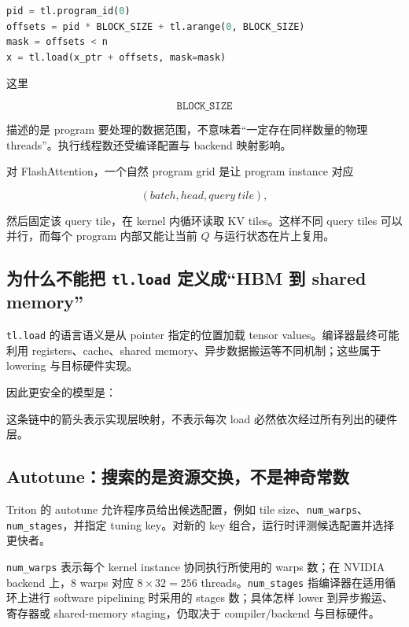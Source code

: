\documentclass[profile=standard,twoside=false]{ipara-handbook}
\begin{document}
\begin{lstlisting}[language=Python]
pid = tl.program_id(0)
offsets = pid * BLOCK_SIZE + tl.arange(0, BLOCK_SIZE)
mask = offsets < n
x = tl.load(x_ptr + offsets, mask=mask)
\end{lstlisting}

这里

$$
\texttt{BLOCK\_SIZE}
$$

描述的是 program 要处理的数据范围，不意味着“一定存在同样数量的物理 threads”。执行线程数还受编译配置与 backend 映射影响。

对 FlashAttention，一个自然 program grid 是让 program instance 对应

$$
(batch,head,query\ tile),
$$

然后固定该 query tile，在 kernel 内循环读取 KV tiles。这样不同 query tiles 可以并行，而每个 program 内部又能让当前 $Q$ 与运行状态在片上复用。

\subsection{为什么不能把 \texttt{tl.load} 定义成“HBM 到 shared memory”}

\texttt{tl.load} 的语言语义是从 pointer 指定的位置加载 tensor values。编译器最终可能利用 registers、cache、shared memory、异步数据搬运等不同机制；这些属于 lowering 与目标硬件实现。

因此更安全的模型是：

\begin{processchain}
\end{processchain}

这条链中的箭头表示实现层映射，不表示每次 load 必然依次经过所有列出的硬件层。

\subsection{Autotune：搜索的是资源交换，不是神奇常数}

Triton 的 autotune 允许程序员给出候选配置，例如 tile size、\texttt{num\_warps}、\texttt{num\_stages}，并指定 tuning key。对新的 key 组合，运行时评测候选配置并选择更快者。

\texttt{num\_warps} 表示每个 kernel instance 协同执行所使用的 warps 数；在 NVIDIA backend 上，8 warps 对应 $8\times32=256$ threads。\texttt{num\_stages} 指编译器在适用循环上进行 software pipelining 时采用的 stages 数；具体怎样 lower 到异步搬运、寄存器或 shared-memory staging，仍取决于 compiler/backend 与目标硬件。
\end{document}

